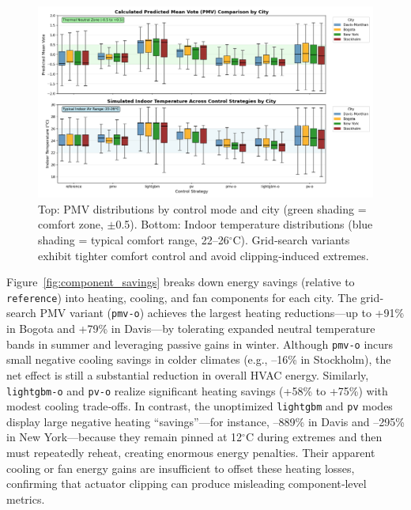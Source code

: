 \begin{figure}[h!]
    \centering
    \includegraphics[width=\linewidth]{figs/thermal_comfort_comparison_improved.png}
    \caption{Top: PMV distributions by control mode and city (green shading = comfort zone, $\pm$0.5). Bottom: Indoor temperature distributions (blue shading = typical comfort range, 22–26$^\circ$C). Grid‐search variants exhibit tighter comfort control and avoid clipping‐induced extremes.}
    \label{fig:thermal_comfort}
\end{figure}

Figure~\ref{fig:component_savings} breaks down energy savings (relative to \texttt{reference}) into heating, cooling, and fan components for each city. The grid‐search PMV variant (\texttt{pmv-o}) achieves the largest heating reductions—up to +91\% in Bogota and +79\% in Davis—by tolerating expanded neutral temperature bands in summer and leveraging passive gains in winter. Although \texttt{pmv-o} incurs small negative cooling savings in colder climates (e.g., –16\% in Stockholm), the net effect is still a substantial reduction in overall HVAC energy. Similarly, \texttt{lightgbm-o} and \texttt{pv-o} realize significant heating savings (+58\% to +75\%) with modest cooling trade‐offs. In contrast, the unoptimized \texttt{lightgbm} and \texttt{pv} modes display large negative heating “savings”—for instance, –889\% in Davis and –295\% in New York—because they remain pinned at 12$^\circ$C during extremes and then must repeatedly reheat, creating enormous energy penalties. Their apparent cooling or fan energy gains are insufficient to offset these heating losses, confirming that actuator clipping can produce misleading component‐level metrics.

